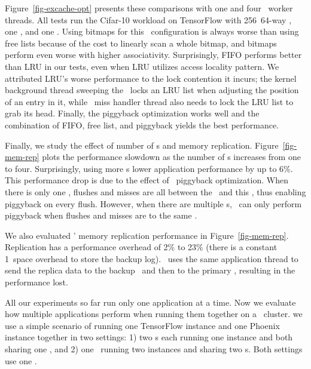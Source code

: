 \documentclass[10pt,times,twocolumn]{z2-article}
\begin{document}
{{{{{{{Figure~\ref{fig-excache-opt} presents these comparisons with one and four \mcomponent\ worker threads. 
All tests run the Cifar-10 workload on TensorFlow with 256\MB\ 64-way \excache, one \mcomponent, and one \scomponent.
Using bitmaps for this \excache\ configuration is always worse than using free lists
because of the cost to linearly scan a whole bitmap,
and bitmaps perform even worse with higher associativity.
Surprisingly, FIFO performs better than LRU in our tests, even when LRU utilizes access locality pattern.
We attributed LRU's worse performance to the lock contention it incurs;
the kernel background thread sweeping the \excache\ locks an LRU list when adjusting the position of an entry in it,
while \excache\ miss handler thread also needs to lock the LRU list to grab its head.
Finally, the piggyback optimization works well and the combination of FIFO, free list, and piggyback yields the best performance.


Finally, we study the effect of number of \mcomponent s and memory replication.
Figure~\ref{fig-mem-rep} plots the performance slowdown as the number of \mcomponent s increases from one to four.
Surprisingly, using more \mcomponent{}s lower application performance by up to 6\%.
This performance drop is due to the effect of \excache\ piggyback optimization. 
When there is only one \mcomponent, flushes and misses are all between the \pcomponent\ and this \mcomponent,
thus enabling piggyback on every flush.
However, when there are multiple \mcomponent{}s, \lego\ can only perform piggyback when flushes and misses are to the same \mcomponent.

We also evaluated \lego' memory replication performance in Figure~\ref{fig-mem-rep}.
Replication has a performance overhead of 2\% to 23\% (there is a constant 1\MB\ space overhead to store the backup log).
\lego\ uses the same application thread to send the replica data to the backup \mcomponent\ and then 
to the primary \mcomponent, resulting in the performance lost. 

All our experiments so far run only one application at a time.
Now we evaluate how multiple applications perform when running them together on a \lego\ cluster.
we use a simple scenario of running one TensorFlow instance and one Phoenix instance together in two settings:
1) two \pcomponent{}s each running one instance and both sharing one \mcomponent,
and 2) one \pcomponent\ running two instances and sharing two \mcomponent{}s.
Both settings use one \scomponent.

}}}}}}}
\end{document}
